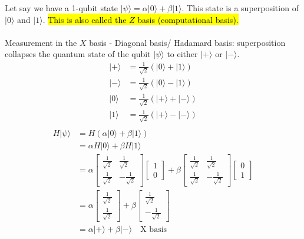 \documentclass{article}
\begin{document}
\noindent Let say we have a 1-qubit state \(| \psi \rangle = \alpha |0\rangle + \beta |1\rangle\). This state is a superposition of \(|0\rangle\) and \(|1\rangle\).\hl{ This is also called the $Z$ basis (computational basis).} \\ \\
Measurement in the $X$ basis - Diagonal basis/ Hadamard basis: superposition collapses the quantum state of the qubit \(|\psi\rangle\) to either \(|+\rangle\) or \(|-\rangle\).
\begin{align*}
	|+\rangle & = \frac{1}{\sqrt{2}}(|0\rangle + |1\rangle) \\
	|-\rangle & = \frac{1}{\sqrt{2}}(|0\rangle - |1\rangle) \\
	|0\rangle & = \frac{1}{\sqrt{2}}(|+\rangle + |-\rangle) \\
	|1\rangle & = \frac{1}{\sqrt{2}}(|+\rangle - |-\rangle) \\
\end{align*}
\begin{align}
	\label{eq:2}
	H |\psi\rangle & = H(\alpha |0\rangle + \beta |1\rangle)                                         \\
	               & = \alpha H|0\rangle + \beta H|1\rangle                                          \\
	               & = \alpha \begin{bmatrix}
		                          \frac{1}{\sqrt{2}} & \frac{1}{\sqrt{2}}  \\
		                          \frac{1}{\sqrt{2}} & -\frac{1}{\sqrt{2}}
	                          \end{bmatrix}
	\begin{bmatrix}
		1 \\
		0
	\end{bmatrix}
	+ \beta \begin{bmatrix}
		        \frac{1}{\sqrt{2}} & \frac{1}{\sqrt{2}}  \\
		        \frac{1}{\sqrt{2}} & -\frac{1}{\sqrt{2}}
	        \end{bmatrix}
	\begin{bmatrix}
		0 \\
		1
	\end{bmatrix}                                                                                   \\
	               & = \alpha \begin{bmatrix}
		                          \frac{1}{\sqrt{2}} \\
		                          \frac{1}{\sqrt{2}}
	                          \end{bmatrix}
	+
	\beta \begin{bmatrix}
		      \frac{1}{\sqrt{2}} \\
		      -\frac{1}{\sqrt{2}}
	      \end{bmatrix}                                                          \\
	               & = \alpha |+\rangle + \beta |-\rangle \quad \text{X basis}
\end{align}
\end{document}
